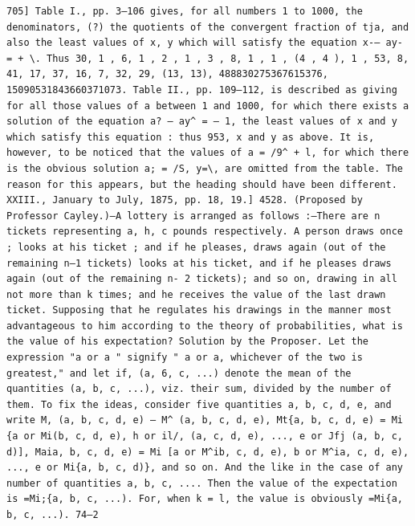 \documentclass[12pt]{article}
\theoremstyle{plain}
\begin{document}
\newpage
\setcounter{page}{587}
\begin{verbatim}
705] Table I., pp. 3—106 gives, for all numbers 1 to 1000, the denominators, (?) the quotients of the convergent fraction of tja, and also the least values of x, y which will satisfy the equation x-— ay- = + \. Thus 30, 1 , 6, 1 , 2 , 1 , 3 , 8, 1 , 1 , (4 , 4 ), 1 , 53, 8, 41, 17, 37, 16, 7, 32, 29, (13, 13), 488830275367615376, 15090531843660371073. Table II., pp. 109—112, is described as giving for all those values of a between 1 and 1000, for which there exists a solution of the equation a? — ay^ = — 1, the least values of x and y which satisfy this equation : thus 953, x and y as above. It is, however, to be noticed that the values of a = /9^ + l, for which there is the obvious solution a; = /S, y=\, are omitted from the table. The reason for this appears, but the heading should have been different. XXIII., January to July, 1875, pp. 18, 19.] 4528. (Proposed by Professor Cayley.)—A lottery is arranged as follows :—There are n tickets representing a, h, c pounds respectively. A person draws once ; looks at his ticket ; and if he pleases, draws again (out of the remaining n—1 tickets) looks at his ticket, and if he pleases draws again (out of the remaining n- 2 tickets); and so on, drawing in all not more than k times; and he receives the value of the last drawn ticket. Supposing that he regulates his drawings in the manner most advantageous to him according to the theory of probabilities, what is the value of his expectation? Solution by the Proposer. Let the expression "a or a " signify " a or a, whichever of the two is greatest," and let if, (a, 6, c, ...) denote the mean of the quantities (a, b, c, ...), viz. their sum, divided by the number of them. To fix the ideas, consider five quantities a, b, c, d, e, and write M, (a, b, c, d, e) — M^ (a, b, c, d, e), Mt{a, b, c, d, e) = Mi {a or Mi(b, c, d, e), h or il/, (a, c, d, e), ..., e or Jfj (a, b, c, d)], Maia, b, c, d, e) = Mi [a or M^ib, c, d, e), b or M^ia, c, d, e), ..., e or Mi{a, b, c, d)}, and so on. And the like in the case of any number of quantities a, b, c, .... Then the value of the expectation is =Mi;{a, b, c, ...). For, when k = l, the value is obviously =Mi{a, b, c, ...). 74—2 
\end{verbatim}
\end{document}
